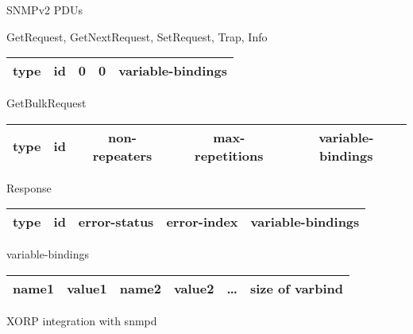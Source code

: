 \documentclass[final,slideColor,colorBG,pdf,fyma]{prosper}
\begin{document}
\begin{slide}{SNMPv2 PDUs}

    \textcolor{BurntOrange}{GetRequest, GetNextRequest, SetRequest, Trap,
	Info}
    \begin{tabular}{|c|c|c|c|c|}
    \hline  
    type & id & 0 & 0 & \textcolor{OliveGreen}{variable-bindings} \\
    \hline  
    \end{tabular}

    \vspace*{.2in}
    \textcolor{BurntOrange}{GetBulkRequest}
    \begin{tabular}{|c|c|c|c|c|}
    \hline  
    type & id & non-repeaters & max-repetitions & 
	\textcolor{OliveGreen}{variable-bindings} \\
    \hline  
    \end{tabular}

    \vspace*{.2in}
    \textcolor{BurntOrange}{Response}
    \begin{tabular}{|c|c|c|c|c|}
    \hline  
    type & id & error-status & error-index & 
	\textcolor{OliveGreen}{variable-bindings} \\
    \hline  
    \end{tabular}

    \vspace*{.2in}
    \textcolor{OliveGreen}{variable-bindings}
    \begin{tabular}{|c|c|c|c|c|c|}
    \hline  
    name1 & value1 & name2 & value2 & \dots & size of varbind \\
    \hline  
    \end{tabular}

\end{slide}




\begin{slide}{XORP integration with snmpd}
\end{slide}


\end{document}
